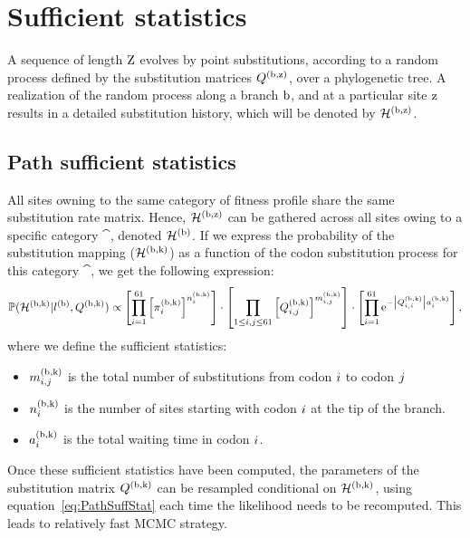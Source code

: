 \documentclass{article}
\begin{document}
	\section{Sufficient statistics}
	\label{sec:sufficient-statistics-mutselne}

	A sequence of length $\text{Z}$ evolves by point substitutions, according to a random process defined by the {substitution} matrices $Q^{(\text{b}, \text{z})}$, over a phylogenetic tree.
	A realization of the random process along a branch $\text{b}$, and at a particular site $\text{z}$ results in a detailed {substitution} history, which will be denoted by $\mathcal{H}^{(\text{b}, \text{z})}$.

	\subsection{Path sufficient statistics}
	All sites owning to the same category of fitness profile share the same {substitution} rate matrix.
	Hence, $\mathcal{H}^{(\text{b}, \text{z})}$ can be gathered across all sites owing to a specific category $\cat$, denoted $\mathcal{H}^{(\text{b})}$.
	If we express the probability of the {substitution} mapping ($\mathcal{H}^{(\text{b}, \text{k})}$) as a function of the {codon} {substitution} process for this category $\cat$, we get the following expression:
	\begin{equation}
		\label{eq:PathSuffStat}
		\mathbb{P} (\mathcal{H}^{(\text{b}, \text{k})} | l^{(\text{b})}, Q^{(\text{b}, \text{k})}) \propto \left[  \prod\limits_{{i}=1}^{61} \left[\pi_{{i}}^{(\text{b}, \text{k})}\right]^{n_{{i}}^{(\text{b}, \text{k})}} \right] \cdot \left[ \prod\limits_{ 1 \leq {i}, {j} \leq 61} \left[Q^{(\text{b}, \text{k})}_{{i}, {j}}\right]^{m_{{i}, {j}}^{(\text{b}, \text{k})}} \right] \cdot \left[ \prod\limits_{{i}=1}^{61} \text{e}^{- \left| Q^{(\text{b}, \text{k})}_{{i}, {i}}\right| a_{{i}}^{(\text{b}, \text{k})}}\right],
	\end{equation}
	where we define the sufficient statistics:
	\begin{itemize}
		\setlength\itemsep{-0.25em}
		\item $m_{{i}, {j}}^{(\text{b}, \text{k})}$ is the total number of substitutions from {codon} ${i}$ to {codon} ${j}$
		\item $n_{{i}}^{(\text{b}, \text{k})}$ is the number of sites starting with {codon} ${i}$ at the tip of the branch.
		\item $a_{{i}}^{(\text{b}, \text{k})}$ is the total waiting time in {codon} ${i}$.
	\end{itemize}
	Once these sufficient statistics have been computed, the parameters of the {substitution} matrix $Q^{(\text{b}, \text{k})}$ can be resampled conditional on $\mathcal{H}^{(\text{b}, \text{k})}$,
	using equation~\ref{eq:PathSuffStat} each time the {likelihood} needs to be recomputed. This leads to relatively fast {MCMC} strategy.
\end{document}
